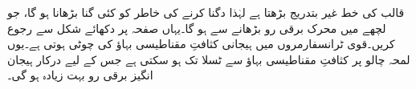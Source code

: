 قالب کی   خط غیر بتدریج بڑھتا ہے لہٰذا   دگنا کرنے کی خاطر  کو کئی گنا بڑھانا ہو گا، جو لچھے میں محرک برقی رو بڑھانے سے ہو گا۔یہاں صفحہ  پر دکھائے  شکل   سے رجوع کریں۔قوی ٹرانسفارمروں میں ہیجانی کثافتِ مقناطیسی بہاؤ کی چوٹی  ہوتی ہے۔یوں لمحہ چالو پر  کثافتِ مقناطیسی بہاؤ   سے   ٹسلا تک ہو سکتی ہے جس کے لیے درکار ہیجان انگیز برقی رو بہت  زیادہ ہو گی۔

